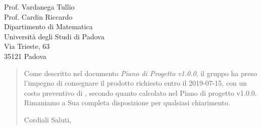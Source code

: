 \begin{letter}{
		Prof. Vardanega Tullio \\
		Prof. Cardin Riccardo \\
		Dipartimento di Matematica \\
		Università degli Studi di Padova \\
		Via Trieste, 63 \\
		35121 Padova}
\begin{quotation}
\noindent Come descritto nel documento \textit{Piano di Progetto v1.0.0}, il gruppo ha preso l'impegno di consegnare il prodotto richiesto entro il 2019-07-15, con un costo preventivo di  \textbf{}, secondo quanto calcolato nel Piano di progetto v1.0.0.\\

Rimaniamo a Sua completa disposizione per qualsiasi chiarimento.

\vspace{0.5cm}
\closing{ Cordiali Saluti,}
	

\end{quotation}
		
\end{letter}


